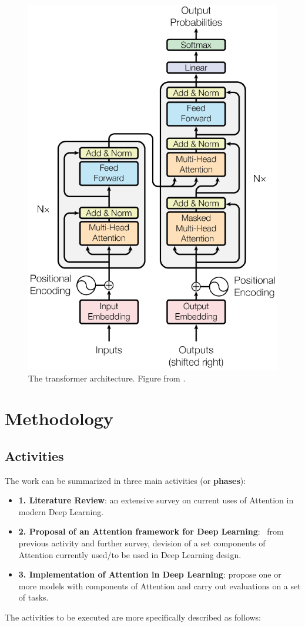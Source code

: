 \documentclass[English]{style/ic-tese-v3}
\begin{document}
\begin{figure}
\begin{center}
    \includegraphics[width=0.4\linewidth]{./img/transformer.png}
\caption{
    The transformer architecture.
    Figure from \cite{ref:transformer}.
}
\label{fig:transformer}
\end{center}
\end{figure}

\let\clearpage\relax
\newpage

\chapter{Methodology}
\section{Activities}
The work can be summarized in three main activities (or \textbf{phases}):
\begin{itemize}
    \item \textbf{1. Literature Review}: an extensive survey on current uses of Attention in modern
        Deep Learning.
    \item \textbf{2. Proposal of an Attention framework for Deep Learning}: \
        from previous activity and further survey,
        devision of a set components of Attention currently used/to be used in Deep Learning design.
    \item \textbf{3. Implementation of Attention in Deep Learning}:
        propose one or more models with components of Attention and carry out evaluations on a set of tasks.
\end{itemize}

The activities to be executed are more specifically described as follows:
\end{document}
